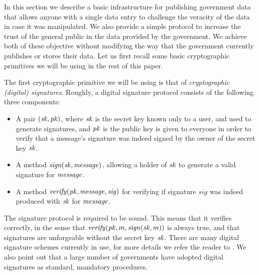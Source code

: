 
In this section we describe a basic infrastructure for publishing government data that allows anyone with a single data entry to challenge the veracity of the data in case it was manipulated. We also provide a simple protocol to increase the trust of the general public in the data provided by the government. We achieve both of these objective without modifying the way that the government currently publishes or stores their data. Let us first recall some basic cryptographic primitives we will be using in the rest of this paper.

\medskip
{} The first cryptographic primitive we will be using is that of {\em cryptographic (digital) signatures}. Roughly, a digital signature protocol consists of the following three components:
\begin{itemize}
\item A pair $(\mathit{sk},\mathit{pk})$, where $\mathit{sk}$ is the secret key known only to a user, and used to generate signatures, and $\mathit{pk}$ is the public key is given to everyone in order to verify that a message's signature was indeed signed by the owner of the secret key $\mathit{sk}$.
\item A method $\mathit{sign}(\mathit{sk},\mathit{message})$, allowing a holder of $\mathit{sk}$ to generate a valid signature for $\mathit{message}$. 
\item A method $\mathit{verify}(\mathit{pk},\mathit{message},\mathit{sig})$ for verifying if signature $\mathit{sig}$ was indeed produced with $\mathit{sk}$ for $\mathit{message}$.
\end{itemize}
The signature protocol is required to be sound. This means that it verifies correctly, in the sense that $\mathit{verify}(\mathit{pk},m,\mathit{sign}(\mathit{sk},m))$ is always true, and that signatures are unforgeable without the secret key $\mathit{sk}$. There are many digital signature schemes currently in use, for more details we refer the reader to \cite{KatzLindell2014}. We also point out that a large number of governments have adopted digital signatures as standard, mandatory procedures.

